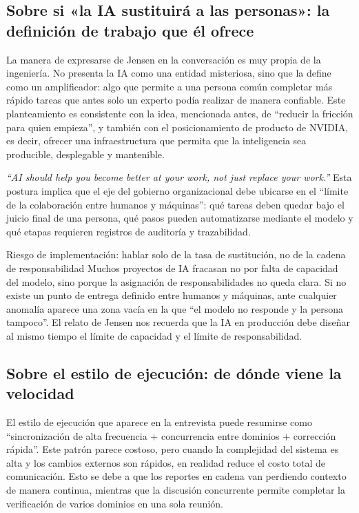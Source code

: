 \documentclass[a4paper]{article}
\begin{document}
\subsection{Sobre si «la IA sustituirá a las personas»: la definición de trabajo que él ofrece}

La manera de expresarse de Jensen en la conversación es muy propia de la ingeniería. No presenta la IA como una entidad misteriosa, sino que la define como un amplificador: algo que permite a una persona común completar más rápido tareas que antes solo un experto podía realizar de manera confiable. Este planteamiento es consistente con la idea, mencionada antes, de ``reducir la fricción para quien empieza'', y también con el posicionamiento de producto de NVIDIA, es decir, ofrecer una infraestructura que permita que la inteligencia sea producible, desplegable y mantenible.

\textit{``AI should help you become better at your work, not just replace your work.''} Esta postura implica que el eje del gobierno organizacional debe ubicarse en el ``límite de la colaboración entre humanos y máquinas'': qué tareas deben quedar bajo el juicio final de una persona, qué pasos pueden automatizarse mediante el modelo y qué etapas requieren registros de auditoría y trazabilidad.

\begin{warningbox}{Riesgo de implementación: hablar solo de la tasa de sustitución, no de la cadena de responsabilidad}
Muchos proyectos de IA fracasan no por falta de capacidad del modelo, sino porque la asignación de responsabilidades no queda clara. Si no existe un punto de entrega definido entre humanos y máquinas, ante cualquier anomalía aparece una zona vacía en la que ``el modelo no responde y la persona tampoco''. El relato de Jensen nos recuerda que la IA en producción debe diseñar al mismo tiempo el límite de capacidad y el límite de responsabilidad.
\end{warningbox}

\subsection{Sobre el estilo de ejecución: de dónde viene la velocidad}

El estilo de ejecución que aparece en la entrevista puede resumirse como ``sincronización de alta frecuencia + concurrencia entre dominios + corrección rápida''. Este patrón parece costoso, pero cuando la complejidad del sistema es alta y los cambios externos son rápidos, en realidad reduce el costo total de comunicación. Esto se debe a que los reportes en cadena van perdiendo contexto de manera continua, mientras que la discusión concurrente permite completar la verificación de varios dominios en una sola reunión.
\end{document}

